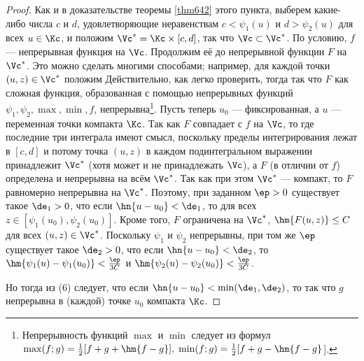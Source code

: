 \documentclass[a4paper]{article}
\begin{document}
\begin{proof}
Как и в доказательстве теоремы \ref{thm642} этого пункта, выберем
какие-либо числа $c$ и $d$, удовлетворяющие неравенствам
$c<\psi_1(u)$ и $d>\psi_2(u)$ для всех $u\in\Kc$, и положим
$\Vc^*=\Kc\times[c,d]$, так что $\Vc\subset\Vc^*$. По условию, $f$
--- непрерывная функция на $\Vc$. Продолжим её до непрерывной
функции $F$ на $\Vc^*$. Это можно сделать многими способами;
например, для каждой точки $(u,z)\in\Vc^*$ положим
Действительно, как легко проверить, тогда
 так что $F$ как
сложная функция, образованная с помощью непрерывных функций
$\psi_1,\psi_2,\max,\min,f$, непрерывна\footnote{Непрерывность
функций $\max$ и $\min$ следует из формул
$\max(f;g)=\frac12[f+g+\hm{f-g}], \;
\min(f;g)=\frac12[f+g-\hm{f-g}$].}. Пусть теперь $u_0$ ---
фиксированная, а $u$ --- переменная точки компакта $\Kc$. Так как
$F$ совпадает с $f$ на $\Vc$, то  где последние три
интеграла имеют смысл, поскольку пределы интегрирования лежат в
$[c,d]$ и потому точка $(u,z)$ в каждом подинтегральном выражении
принадлежит $\Vc^*$ (хотя может и не принадлежать $\Vc$), а $F$ (в
отличии от $f$) определена и непрерывна на всём $\Vc^*$. Так как при
этом $\Vc^*$ --- компакт, то $F$ равномерно непрерывна на $\Vc^*$.
Поэтому, при заданном $\ep>0$ существует такое $\de_1>0$, что если
$\hn{u-u_0}<\de_1$, то  для всех
$z\in[\psi_1(u_0),\psi_2(u_0)]$. Кроме того, $F$ ограничена на
$\Vc^*$, $\hm{F(u,z)}\le C$ для всех $(u,z)\in\Vc^*$. Поскольку
$\psi_1$ и $\psi_2$ непрерывны, при том же $\ep$ существует такое
$\de_2>0$, что если $\hn{u-u_0}<\de_2$, то
$\hm{\psi_1(u)-\psi_1(u_0)}<\frac{\ep}{3C}$ и
$\hm{\psi_2(u)-\psi_2(u_0)}<\frac{\ep}{3C}$.

Но тогда из (6) следует, что если $\hn{u-u_0}<\min(\de_1,\de_2)$, то
 так что $g$ непрерывна в (каждой) точке $u_0$
компакта $\Kc$.
\end{proof}
\end{document}
